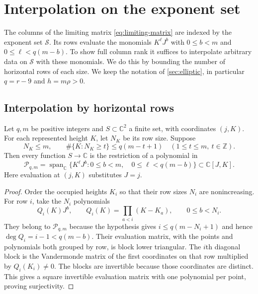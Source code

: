 \section{Interpolation on the exponent set}
\label{sec:interpolation}

The columns of the limiting matrix \eqref{eq:limiting-matrix} are indexed by the exponent set $\mathcal S$. Its rows evaluate the monomials $K^\ell J^b$ with $0\le b<m$ and $0\le\ell<q(m-b)$. To show full column rank it suffices to interpolate arbitrary data on $\mathcal S$ with these monomials. We do this by bounding the number of horizontal rows of each size. We keep the notation of \cref{sec:elliptic}, in particular $q=r-9$ and $h=m\rho>0$.

\subsection{Interpolation by horizontal rows}

\begin{lemma}\label{lem:interpolation}
Let $q,m$ be positive integers and $S\subset\mathbb{C}^2$ a finite set, with coordinates $(j,K)$. For each represented height $K$, let $N_K$ be its row size. Suppose
\[
 N_K\le m,\qquad
 \#\{K:N_K\ge t\}\le q(m-t+1)
 \quad(1\le t\le m,\ t\in\mathbb{Z}).
\]
Then every function $S\to\mathbb{C}$ is the restriction of a polynomial in
\[
 \mathcal{P}_{q,m}
 =\operatorname{span}_{\mathbb{C}}
 \bigl\{K^\ell J^b:0\le b<m,\quad0\le\ell<q(m-b)\bigr\}
 \subset\mathbb{C}[J,K].
\]
Here evaluation at $(j,K)$ substitutes $J=j$.
\end{lemma}

\begin{proof}
Order the occupied heights $K_i$ so that their row sizes $N_i$ are nonincreasing. For row $i$, take the $N_i$ polynomials
\[
 Q_i(K)J^b,\qquad
 Q_i(K)=\prod_{a<i}(K-K_a),\qquad 0\le b<N_i .
\]
They belong to $\mathcal P_{q,m}$ because the hypothesis gives $i\le q(m-N_i+1)$ and hence $\deg Q_i=i-1<q(m-b)$. Their evaluation matrix, with the points and polynomials both grouped by row, is block lower triangular. The $i$th diagonal block is the Vandermonde matrix of the first coordinates on that row multiplied by $Q_i(K_i)\ne0$. The blocks are invertible because those coordinates are distinct. This gives a square invertible evaluation matrix with one polynomial per point, proving surjectivity.
\end{proof}


